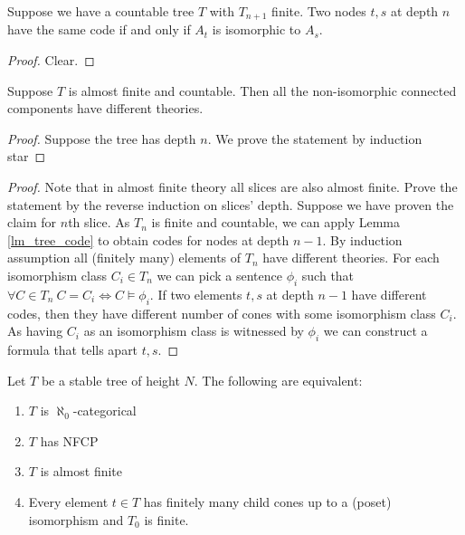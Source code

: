 \documentclass{amsart}
\begin{document}
\begin{Lemma} \label{lm_tree_code}
	Suppose we have a countable tree $T$ with $T_{n+1}$ finite. Two nodes $t,s$ at depth $n$ have the same code if and only if $A_t$ is isomorphic to $A_s$.
\end{Lemma}

\begin{proof}
	Clear.
\end{proof}

\begin{Lemma} \label{lm_categoricity}
	Suppose $T$ is almost finite and countable. Then all the non-isomorphic connected components have different theories.
\end{Lemma}

\begin{proof}
	Suppose the tree has depth $n$. We prove the statement by induction star
\end{proof}

\begin{proof}
	Note that in almost finite theory all slices are also almost finite. Prove the statement by the reverse induction on slices' depth. Suppose we have proven the claim for $n$th slice. As $T_n$ is finite and countable, we can apply Lemma \ref{lm_tree_code} to obtain codes for nodes at depth $n-1$. By induction assumption all (finitely many) elements of $T_n$ have different theories. For each isomorphism class $C_i \in T_n$ we can pick a sentence $\phi_i$ such that $\forall C \in T_n \  C = C_i \iff C \models \phi_i$. If two elements $t,s$ at depth $n-1$ have different codes, then they have different number of cones with some isomorphism class $C_i$. As having $C_i$ as an isomorphism class is witnessed by $\phi_i$ we can construct a formula that tells apart $t,s$.
\end{proof}

\begin{Theorem} \label{th_tree_nfcp}
	Let $T$ be a stable tree of height $N$. The following are equivalent:
	\begin{enumerate}
		\item $T$ is $\aleph_0$-categorical
		\item $T$ has NFCP
		\item $T$ is almost finite
		\item Every element $t \in T$ has finitely many child cones up to a (poset) isomorphism and $T_0$ is finite.
	\end{enumerate}
\end{Theorem}
\end{document}
